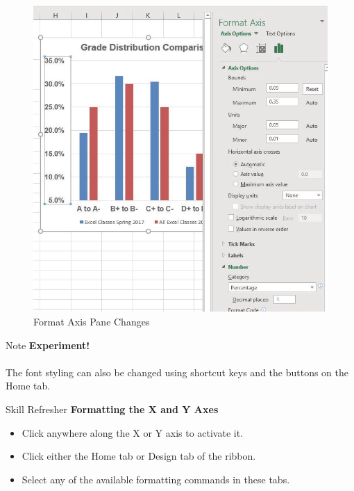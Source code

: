 \begin{figure}[H]
	\centering
	\includegraphics[width=\maxwidth{.95\linewidth}]{gfx/ch04_fig29}
	\caption{Format Axis Pane Changes}
	\label{04:fig29}
\end{figure}

\begin{center}
	\begin{infobox}{Note}
		\textbf{Experiment!}
		\\
		\\
		The font styling can also be changed using shortcut keys and the buttons on the Home tab.
	\end{infobox}
\end{center}

\begin{center}
	\begin{sklbox}{Skill Refresher}
		\textbf{Formatting the X and Y Axes}
		\\
		\begin{itemize}
			\setlength{\itemsep}{0pt}
			\setlength{\parskip}{0pt}
			\setlength{\parsep}{0pt}

			\item Click anywhere along the X or Y axis to activate it.
			\item Click either the Home tab or Design tab of the ribbon.
			\item Select any of the available formatting commands in these tabs.
			
		\end{itemize}
	\end{sklbox}
\end{center}

